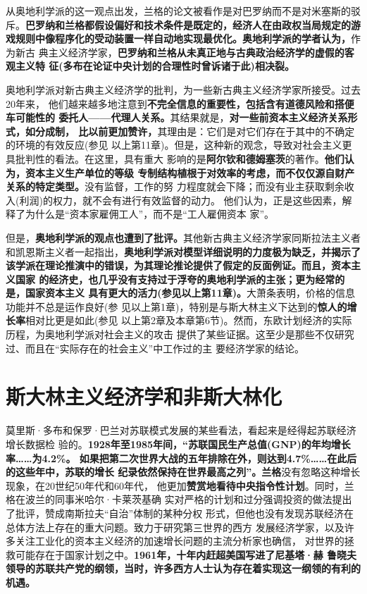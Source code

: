 从奥地利学派的这一观点出发，兰格的论文被看作是对巴罗纳而不是对米塞斯的驳
斥。\textbf{巴罗纳和兰格都假设偏好和技术条件是既定的，经济人在由政权当局规定的游
  戏规则中像程序化的受动装置一样自动地实现最优化。奥地利学派的学者认为，}作为新古
典主义经济学家，\textbf{巴罗纳和兰格从未真正地与古典政治经济学的虚假的客观主义特
  征(多布在论证中央计划的合理性时曾诉诸于此)相决裂。}

奥地利学派对新古典主义经济学的批判，为一些新古典主义经济学家所接受。过去20年来，
他们越来越多地注意到\textbf{不完全信息的重要性，包括含有道德风险和搭便车可能性的
  委托人——代理人关系。}其结果就是，\textbf{对一些前资本主义经济关系形式，如分成制，
  比以前更加赞许，}其理由是：它们是对它们存在于其中的不确定的环境的有效反应(参见
以上第11章)。但是，这种新的观念，导致对社会主义更具批判性的看法。在这里，具有重大
影响的是\textbf{阿尔钦和德姆塞茨}的著作。\textbf{他们认为，资本主义生产单位的等级
  专制结构植根于对效率的考虑，而不仅仅源自财产关系的特定类型。}没有监督，工作的努
力程度就会下降；而没有业主获取剩余收入(利润)的权力，就不会有进行有效监督的动力。
他们认为，正是这些因素，解释了为什么是“资本家雇佣工人”，而不是“工人雇佣资本
家”。

但是，\textbf{奥地利学派的观点也遭到了批评。}其他新古典主义经济学家同斯拉法主义者
和凯恩斯主义者一起指出，\textbf{奥地利学派对模型详细说明的力度极为缺乏，并揭示了
  该学派在理论推演中的错误，为其理论推论提供了假定的反面例证。而且，资本主义国家
  的经济史，也几乎没有支持过于浮夸的奥地利学派的主张；更为经常的是，国家资本主义
  具有更大的活力(参见以上第11章)。}大萧条表明，价格的信息功能并不总是运作良好(参
见以上第1章)，特别是与斯大林主义下达到的\textbf{惊人的增长率}相对比更是如此(参见
以上第2章及本章第6节)。然而，东欧计划经济的实际历程，为奥地利学派对社会主义的攻击
提供了某些证据。这至少是那些不仅研究过、而且在“实际存在的社会主义”中工作过的主
要经济学家的结论。

\section{斯大林主义经济学和非斯大林化}

莫里斯·多布和保罗·巴兰对苏联模式发展的某些看法，看起来是经得起苏联经济增长数据检
验的。\textbf{1928年至1985年间，“苏联国民生产总值(GNP)的年均增长率……为4.2\%。
  如果把第二次世界大战的五年排除在外，则达到4.7\%……在此后的这些年中，苏联的增长
  纪录依然保持在世界最高之列”。兰格}没有忽略这种增长现象，在20世纪50年代和60年代，
他更加\textbf{赞赏地看待中央指令性计划}。同时，兰格在波兰的同事米哈尔·卡莱茨基确
实对严格的计划和过分强调投资的做法提出了批评，赞成南斯拉夫“自治”体制的某种分权
形式，但他也没有发现苏联经济在总体方法上存在的重大问题。致力于研究第三世界的西方
发展经济学家，以及许多关注工业化的资本主义经济的加速增长问题的主流分析家也确信，
对世界的拯救可能存在于国家计划之中。\textbf{1961年，十年内赶超美国写进了尼基塔·赫
  鲁晓夫领导的苏联共产党的纲领，当时，许多西方人士认为存在着实现这一纲领的有利的
  机遇。}

